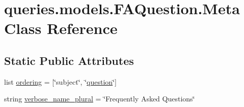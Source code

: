 \hypertarget{classqueries_1_1models_1_1_f_a_question_1_1_meta}{\section{queries.\-models.\-F\-A\-Question.\-Meta Class Reference}
\label{classqueries_1_1models_1_1_f_a_question_1_1_meta}
}
\subsection*{Static Public Attributes}
\begin{DoxyCompactItemize}
\item 
list \hyperlink{classqueries_1_1models_1_1_f_a_question_1_1_meta_aaae6f66fc19f80e21b763850f5b0a81d}{ordering} = \mbox{[}\char`\"{}subject\char`\"{}, \char`\"{}\hyperlink{classqueries_1_1models_1_1_f_a_question_aeb9a06018cf2c003de403276063c620e}{question}\char`\"{}\mbox{]}
\item 
string \hyperlink{classqueries_1_1models_1_1_f_a_question_1_1_meta_a5801c8deb1baf27bb00dcd39388b1406}{verbose\-\_\-name\-\_\-plural} = \char`\"{}Frequently Asked Questions\char`\"{}
\end{DoxyCompactItemize}


